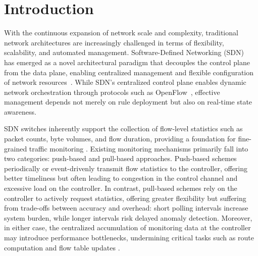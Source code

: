 \section{Introduction}

With the continuous expansion of network scale and complexity, traditional network architectures are increasingly challenged in terms of flexibility, scalability, and automated management. 
Software-Defined Networking (SDN)~\cite{JANG2023105736} has emerged as a novel architectural paradigm that decouples the control plane from the data plane, enabling centralized management and flexible configuration of network resources~\cite{9360650}. 
While SDN's centralized control plane enables dynamic network orchestration through protocols such as OpenFlow~\cite{10.1145/1355734.1355746}, effective management depends not merely on rule deployment but also on real-time state awareness. 

SDN switches inherently support the collection of flow-level statistics such as packet counts, byte volumes, and flow duration, providing a foundation for fine-grained traffic monitoring \cite{KALAMBE2025104081}. Existing monitoring mechanisms primarily fall into two categories: push-based \cite{10.1145/3373360.3380830, 6888899, 10.1007/978-3-642-36516-4_4} and pull-based \cite{7037094, CASTILLO2020107108, 8411125, 10.1007/978-3-642-12334-4_21} approaches. 
Push-based schemes periodically or event-drivenly transmit flow statistics to the controller, offering better timeliness but often leading to congestion in the control channel and excessive load on the controller. 
In contrast, pull-based schemes rely on the controller to actively request statistics, offering greater flexibility but suffering from trade-offs between accuracy and overhead: short polling intervals increase system burden, while longer intervals risk delayed anomaly detection. 
Moreover, in either case, the centralized accumulation of monitoring data at the controller may introduce performance bottlenecks, undermining critical tasks such as route computation and flow table updates \cite{8291608}.

